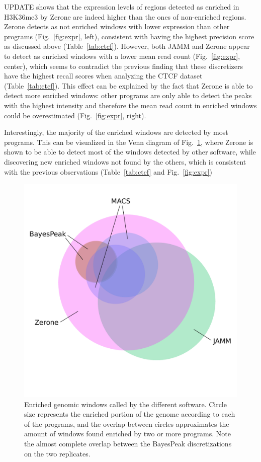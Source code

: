 \documentclass{bioinfo}
\begin{document}
UPDATE shows that the expression levels of regions detected as
enriched in H3K36me3 by Zerone are indeed higher than the ones of non-enriched
regions. Zerone detects as not enriched windows with lower expression than other
programs (Fig.~\ref{fig:expr}, left), consistent with having the highest
precision score as discussed above (Table~\ref{tab:ctcf}). However, both JAMM
and Zerone appear to detect as enriched windows with a lower mean read count
(Fig.~\ref{fig:expr}, center), which seems to contradict the previous finding
that these discretizers have the highest recall scores when analyzing the CTCF
dataset (Table~\ref{tab:ctcf}). This effect can be explained by the fact that
Zerone is able to detect more enriched windows: other programs are only able to
detect the peaks with the highest intensity and therefore the mean read count in
enriched windows could be overestimated (Fig.~\ref{fig:expr}, right).


Interestingly, the majority of the enriched windows are detected by most
programs. This can be visualized in the Venn diagram of Fig.~\ref{fig:venn},
where Zerone is shown to be able to detect most of the windows detected by other
software, while discovering new enriched windows not found by the others, which
is consistent with the previous observations (Table~\ref{tab:ctcf} and
Fig.~\ref{fig:expr})

\begin{figure}[!tpb]
\centerline{\includegraphics[scale=0.5]{histone_venn_color_names.pdf}}
\caption{Enriched genomic windows called by the different software. Circle size
represents the enriched portion of the genome according to each of the programs,
and the overlap between circles approximates the amount of windows found
enriched by two or more programs. Note the almost complete overlap between the
BayesPeak discretizations on the two replicates.}\label{fig:venn}
\end{figure}
\end{document}
